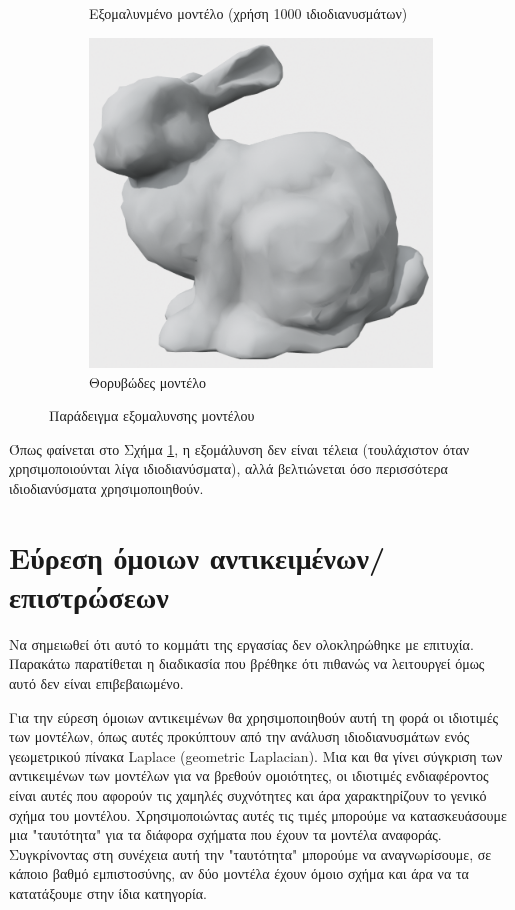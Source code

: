 \documentclass[draft]{article}
\begin{document}
\begin{figure}[h]
\begin{subfigure}{0.4\textwidth}
		\caption{Εξομαλυνμένο μοντέλο (χρήση 1000 ιδιοδιανυσμάτων)}
	\end{subfigure}
	\begin{subfigure}{0.4\textwidth}
		\includegraphics[width=\textwidth]{"noisy_mesh.png"}
		\caption{Θορυβώδες μοντέλο}
	\end{subfigure}
	\caption{Παράδειγμα εξομαλυνσης μοντέλου}
	\label{fig:simplify}
\end{figure}

Όπως φαίνεται στο Σχήμα \ref{fig:simplify}, η εξομάλυνση δεν είναι τέλεια
(τουλάχιστον όταν χρησιμοποιούνται λίγα ιδιοδιανύσματα), αλλά βελτιώνεται όσο
περισσότερα ιδιοδιανύσματα χρησιμοποιηθούν.

\section{Εύρεση όμοιων αντικειμένων/επιστρώσεων}
Να σημειωθεί ότι αυτό το κομμάτι της εργασίας δεν ολοκληρώθηκε με επιτυχία.
Παρακάτω παρατίθεται η διαδικασία που βρέθηκε ότι πιθανώς να λειτουργεί όμως αυτό δεν
είναι επιβεβαιωμένο.

Για την εύρεση όμοιων αντικειμένων θα χρησιμοποιηθούν αυτή τη φορά οι ιδιοτιμές
των μοντέλων, όπως αυτές προκύπτουν από την ανάλυση ιδιοδιανυσμάτων ενός γεωμετρικού
πίνακα Laplace (geometric Laplacian).
Μια και θα γίνει σύγκριση των αντικειμένων των μοντέλων για να βρεθούν
ομοιότητες, οι ιδιοτιμές ενδιαφέροντος είναι αυτές που αφορούν τις χαμηλές συχνότητες
και άρα χαρακτηρίζουν το γενικό σχήμα του μοντέλου. Χρησιμοποιώντας αυτές τις τιμές
μπορούμε να κατασκευάσουμε μια "ταυτότητα" για τα διάφορα σχήματα που έχουν τα
μοντέλα αναφοράς.
Συγκρίνοντας στη συνέχεια αυτή την "ταυτότητα" μπορούμε να αναγνωρίσουμε,
σε κάποιο βαθμό εμπιστοσύνης,
αν δύο μοντέλα έχουν όμοιο σχήμα και άρα να τα κατατάξουμε στην ίδια κατηγορία.
\end{document}
